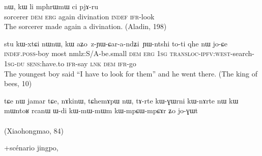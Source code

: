 \documentclass[oldfontcommands,oneside,a4paper,11pt]{article}
\newcommand{\ipa}[1]{{\phon \mbox{#1}}} %
\begin{document}
 
 
 \citet{himmelmann14asymmetries}
 
 \begin{exe}
\ex
\gll \ipa{sŋaʁspa}  	\ipa{nɯ,}  	\ipa{kɯ}  	\ipa{li}  	\ipa{mphrɯmɯ}  	\ipa{ci}  	\ipa{pjɤ-ru}  
\\
sorcerer \textsc{dem} \textsc{erg} again divination \textsc{indef} \textsc{ifr}-look \\
\glt The sorcerer made again a divination. (Aladin, 198)
\end{exe}

 \begin{exe}
\ex
\gll \ipa{tɤ-tɕɯ}  	\ipa{stu}  	\ipa{kɯ-xtɕi}  	\ipa{nɯnɯ,}  	\ipa{kɯ}  	\ipa{aʑo z-ɲɯ-ɕar-a-ndʑi ɲɯ-ntshi}  	\ipa{to-ti}  	\ipa{qhe}  	\ipa{nɯ}  	\ipa{jo-ɕe}  	\\
\textsc{indef.poss}-boy most nmlz:S/A-be.small \textsc{dem} \textsc{erg} \textsc{1sg} \textsc{transloc-ipfv:west}-search-\textsc{1sg-du} \textsc{sens}:have.to \textsc{ifr}-say \textsc{lnk} \textsc{dem} \textsc{ifr}-go \\
\glt The youngest boy said ``I have to look for them'' and he went there. (The king of bees, 10)
\end{exe}
 \begin{exe}
\ex
\gll
\ipa{tɕe}  	\ipa{nɯ}  	\ipa{jamar}  	\ipa{tɕe,}  	\ipa{nɤkinɯ,}  	\ipa{tɕhemɤpɯ}  	\ipa{nɯ,}  	\ipa{tɤ-rte}  	\ipa{kɯ-ɣɯrni}  	\ipa{kɯ-nɤrte}  	\ipa{nɯ}  	\ipa{kɯ}  	\ipa{mɯntoʁ}  	\ipa{rcanɯ}  	\ipa{ɯ-di}  	\ipa{kɯ-mɯ-mɯm}  	\ipa{kɯ-mpɕɯ-mpɕɤr}  	\ipa{ʑo}  	\ipa{jo-ɣɯt} \\
\\ 
\glt  (Xiaohongmao, 84)
\end{exe}

+scénario jingpo, \citet{delancey11nocte, delancey14second}




 
\end{document}
